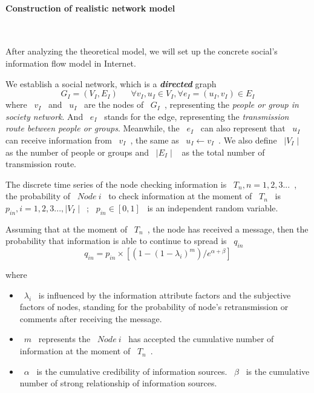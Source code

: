 \documentclass[a4paper,11pt]{article}
\begin{document}
\paragraph{Construction of realistic network model}
\textrm{\\}
\par After analyzing the theoretical model, we will set up the concrete social's information flow model in Internet.
\par We establish a social network, which is a \textbf{\emph{directed}} graph
\begin{equation}
G_I=(V_I,E_I)~~~~~~~\forall  v_I,u_I\in V_I , \forall e_I=(u_I,v_I)\in E_I
\end{equation}
where ~$v_I$~ and ~$u_I$~ are the nodes of ~$G_I$~, representing the \emph{people or group in society network}. And ~$e_I$~ stands for the edge, representing the \emph{transmission route between people or groups}. Meanwhile, the ~$e_I$~ can also represent that ~$u_I$~ can receive information from ~$v_I$~, the same as ~$u_I\leftarrow v_I$~. We also define ~$\mid V_I\mid$~ as the number of people or groups and ~$\mid E_I\mid$~ as the total number of transmission route.
\par The discrete time series of the node checking information is ~$T_n,n=1,2,3...$~, the probability of ~$Node~i$~ to check information at the moment of ~$T_n$~ is ~$p_{in},i=1,2,3...,\mid V_I\mid$~; ~$p_{in}\in [0,1]$~ is an independent random variable.
\par Assuming that at the moment of ~$T_n$~, the node has received a message, then the probability that information is able to continue to spread is ~$q_{in}$~
\begin{equation}
q_{in}=p_{in} \times [(1-(1-\lambda_{i})^m)/e^{\alpha +\beta}]
\end{equation}

where 
\begin{itemize}
\item ~$\lambda_{i}$~ is influenced by the information attribute factors and the subjective factors of nodes, standing for the probability of node's retransmission or comments after receiving the message.
\item ~$m$~ represents the ~$Node~i$~ has accepted the cumulative number of information at the moment of ~$T_n$~. 
\item ~$\alpha$~ is the cumulative credibility of information sources. ~$\beta$~ is the cumulative number of strong relationship of information sources.
\end{itemize}
\end{document}
